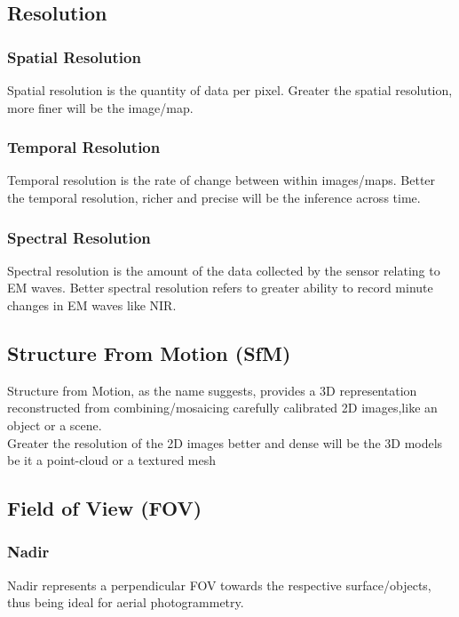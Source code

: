 \documentclass[11pt,twocolumn,letterpaper]{article}
\begin{document}
\subsection{Resolution}
\subsubsection{Spatial Resolution}

Spatial resolution is the quantity of data per pixel. Greater the spatial resolution, more finer will be the image/map. 


\subsubsection{Temporal Resolution}

Temporal resolution is the rate of change between within images/maps. Better the temporal resolution, richer and precise will be the inference across time.

\subsubsection{Spectral Resolution}

Spectral resolution is the amount of the data collected by the sensor relating to EM waves. Better spectral resolution refers to greater ability to record minute changes in EM waves like NIR. 

\subsection{Structure From Motion (SfM)}

Structure from Motion, as the name suggests, provides a 3D representation reconstructed from combining/mosaicing carefully calibrated 2D images,like an object or a scene.
\\ Greater the resolution of the 2D images better and dense will be the 3D models be it a point-cloud or a textured mesh


\subsection{Field of View (FOV)}
\subsubsection{Nadir}
Nadir represents a perpendicular FOV towards the respective surface/objects, thus being ideal for aerial photogrammetry.
\end{document}
